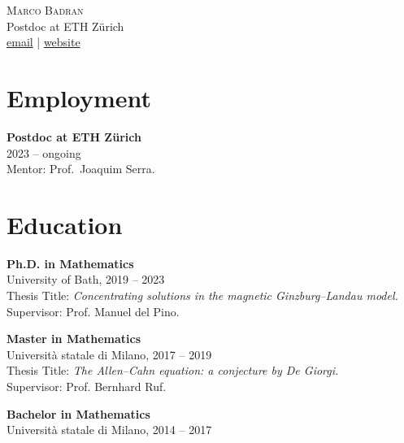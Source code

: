 \documentclass[a4paper,11pt]{article}
\begin{document}
\begin{center}
    {\Large \textsc{Marco Badran}} \\ %
    \vspace{2mm}
    \small Postdoc at ETH Z\"urich \\
    \vspace{2mm}
    \href{mailto:marco.badran@math.ethz.ch}{email} | \href{https://marco-badran.github.io/marco-badran/}{website} 
\end{center}

\vspace{10mm}

\section*{Employment}
\noindent
\textbf{Postdoc at ETH Z\"urich} \\
2023 -- ongoing \\
Mentor: Prof.\ Joaquim Serra.
\vspace{5mm}

\section*{Education}
\noindent
\textbf{Ph.D. in Mathematics} \\
University of Bath, 2019 -- 2023 \\
Thesis Title: \textit{Concentrating solutions in the magnetic Ginzburg--Landau model.} \\
Supervisor: Prof. Manuel del Pino.

\vspace{3mm}

\textbf{Master in Mathematics} \\
Università statale di Milano, 2017 -- 2019 \\
Thesis Title: \textit{The Allen--Cahn equation: a conjecture by De Giorgi.} \\
Supervisor: Prof. Bernhard Ruf.

\vspace{3mm}

\textbf{Bachelor in Mathematics} \\
Università statale di Milano, 2014 -- 2017 

\vspace{5mm}

\end{document}
